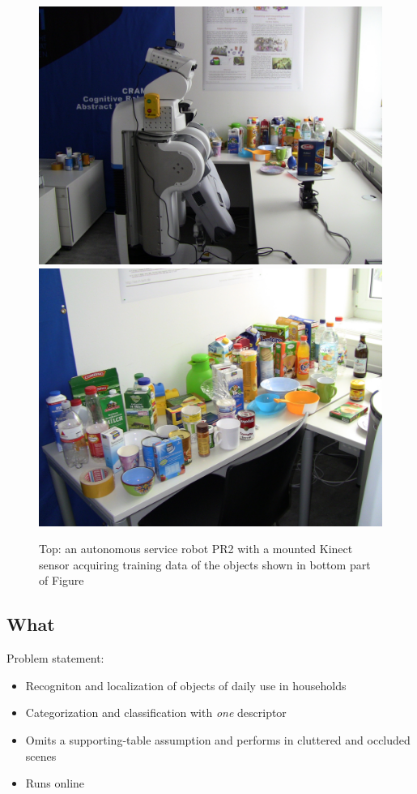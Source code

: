 \documentclass[conference]{sty/IEEEtran}
\begin{document}
\begin{figure}[htb!]
  \begin{center}
    \includegraphics[width=.9\columnwidth]{figures/objects/pr2_rot_table.jpg}
    \includegraphics[width=.9\columnwidth]{figures/objects/objects.jpg}
    \caption{Top: an autonomous service robot PR2 with a mounted Kinect sensor
    acquiring training data of the objects shown in bottom part of Figure}
    \label{fig:robot}
  \end{center}
\end{figure}


\subsection{What}
Problem statement:
\begin{itemize}
\item Recogniton and localization of objects of daily use in households
\item Categorization and classification with \emph{one} descriptor
\item Omits a supporting-table assumption and performs in cluttered and occluded scenes
\item Runs online
\end{itemize}
\end{document}
